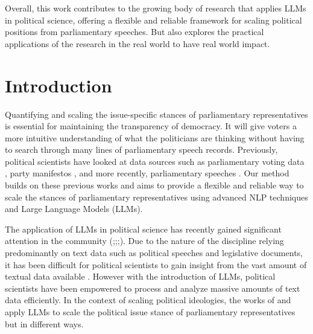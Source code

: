 \documentclass[final,5p,times,twocolumn,authoryear]{elsarticle}
\begin{document}
Overall, this work contributes to the growing body of research that applies LLMs in political science, offering a flexible and reliable framework for scaling political positions from parliamentary speeches. But also explores the practical applications of the research in the real world to have real world impact. 

\section{Introduction}
Quantifying and scaling the issue-specific stances of parliamentary representatives is essential for maintaining the transparency of democracy. It will give voters a more intuitive understanding of what the politicians are thinking without having to search through many lines of parliamentary speech records. Previously, political scientists have looked at data sources such as parliamentary voting data \citep{dw-nominate}, party manifestos \citep{CATALINAC_2018}, and more recently, parliamentary speeches \citep{Word-embeddings-for-analysis-of-ideological-placement}. Our method builds on these previous works and aims to provide a flexible and reliable way to scale the stances of parliamentary representatives using advanced NLP techniques and Large Language Models (LLMs).

The application of LLMs in political science has recently gained significant attention in the community (\cite{LLMs-and-political-science};\cite{kato2024lupinllmbasedpoliticalideology};\cite{llm-latent-position-of-politicians};\cite{li2024politicalllmlargelanguagemodels}). Due to the nature of the discipline relying predominantly on text data such as political speeches and legislative documents, it has been difficult for political scientists to gain insight from the vast amount of textual data available \citep{li2024politicalllmlargelanguagemodels}. However with the introduction of LLMs, political scientists have been empowered to process and analyze massive amounts of text data efficiently. In the context of scaling political ideologies, the works of  \citeauthor{kato2024lupinllmbasedpoliticalideology} and \citeauthor{llm-latent-position-of-politicians} apply LLMs to scale the political issue stance of parliamentary representatives but in different ways. 
\end{document}
